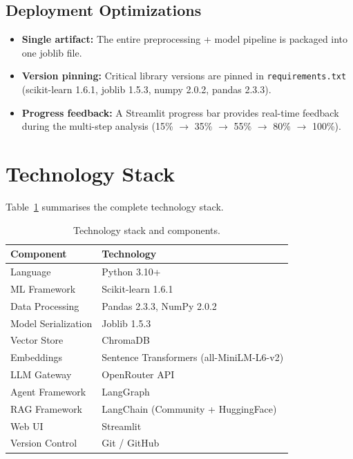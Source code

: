 \documentclass[11pt,a4paper]{article}
\begin{document}
\subsection{Deployment Optimizations}

\begin{itemize}[leftmargin=*]
    \item \textbf{Single artifact:} The entire preprocessing + model pipeline is packaged into one joblib file.
    \item \textbf{Version pinning:} Critical library versions are pinned in \texttt{requirements.txt} (scikit-learn 1.6.1, joblib 1.5.3, numpy 2.0.2, pandas 2.3.3).
    \item \textbf{Progress feedback:} A Streamlit progress bar provides real-time feedback during the multi-step analysis (15\% $\rightarrow$ 35\% $\rightarrow$ 55\% $\rightarrow$ 80\% $\rightarrow$ 100\%).
\end{itemize}

\section{Technology Stack}

Table~\ref{tab:tech-stack} summarises the complete technology stack.

\begin{table}[H]
    \centering
    \caption{Technology stack and components.}
    \label{tab:tech-stack}
    \begin{tabular}{ll}
        \toprule
        \textbf{Component} & \textbf{Technology} \\
        \midrule
        Language & Python 3.10+ \\
        ML Framework & Scikit-learn 1.6.1 \\
        Data Processing & Pandas 2.3.3, NumPy 2.0.2 \\
        Model Serialization & Joblib 1.5.3 \\
        Vector Store & ChromaDB \\
        Embeddings & Sentence Transformers (all-MiniLM-L6-v2) \\
        LLM Gateway & OpenRouter API \\
        Agent Framework & LangGraph \\
        RAG Framework & LangChain (Community + HuggingFace) \\
        Web UI & Streamlit \\
        Version Control & Git / GitHub \\
        \bottomrule
    \end{tabular}
\end{table}
\end{document}
